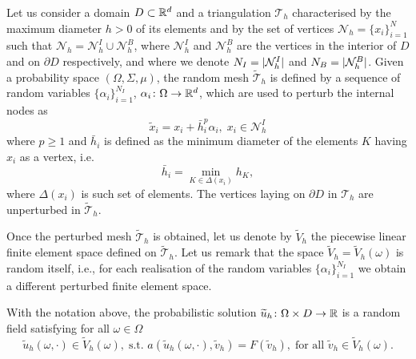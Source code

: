 \begin{definition} \label{def:RandomMesh} Let us consider a domain $D \subset \mathbb{R}^d$ and a triangulation $\mathcal T_h$ characterised by the maximum diameter $h > 0$ of its elements and by the set of vertices $\mathcal N_h = \{x_i\}_{i=1}^{N}$ such that $\mathcal N_h = \mathcal N_h^I \cup \mathcal N_h^B$, where $\mathcal N_h^I$ and $\mathcal N_h^B$ are the vertices in the interior of $D$ and on $\partial D$ respectively, and where we denote $N_I = \lvert\mathcal N_h^I\rvert$ and $N_B = \lvert\mathcal N_h^B\rvert$. Given a probability space $(\Omega, \Sigma, \mu)$, the random mesh $\widetilde {\mathcal T}_h$ is defined by a sequence of random variables $\{\alpha_i\}_{i=1}^{N_I}$, $\alpha_i \colon \Omega \to \mathbb{R}^d$, which are used to perturb the internal nodes as
	\begin{equation}
	\tilde x_i = x_i + \bar h_i^p \alpha_i, \; x_i \in \mathcal N_h^I
	\end{equation}
	where $p \geq 1$ and $\bar h_i$ is defined as the minimum diameter of the elements $K$ having $x_i$ as a vertex, i.e.
	\begin{equation}
	\bar h_i = \min_{K \in \Delta(x_i)} h_K,
	\end{equation}
	where $\Delta(x_i)$ is such set of elements. The vertices laying on $\partial D$ in $\mathcal T_h$ are unperturbed in $\widetilde {\mathcal T}_h$.
\end{definition}

Once the perturbed mesh $\widetilde {\mathcal T}_h$ is obtained, let us denote by $\widetilde V_h$ the piecewise linear finite element space defined on $\widetilde {\mathcal T}_h$. Let us remark that the space $\widetilde V_h = \widetilde V_h(\omega)$ is random itself, i.e., for each realisation of the random variables $\{\alpha_i\}_{i=1}^{N_I}$ we obtain a different perturbed finite element space.


\begin{definition} \label{def:ProbSolution} With the notation above, the probabilistic solution $\widetilde u_h \colon \Omega \times D \to \mathbb{R}$ is a random field satisfying for all $\omega \in \Omega$
	\begin{equation}
		\widetilde u_h(\omega, \cdot) \in \widetilde V_h(\omega), \; \text{s.t. } a(\widetilde u_h(\omega, \cdot), \widetilde v_h) = F(\widetilde v_h), \; \text{for all } \widetilde v_h \in \widetilde V_h(\omega). 
	\end{equation}
\end{definition}

